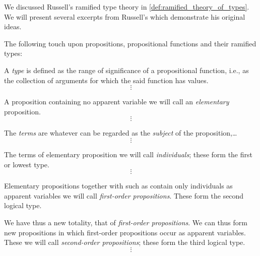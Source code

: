 \begin{remark}\label{rem:hol_formula_order_origin}
  We discussed Russell's ramified type theory in \cref{def:ramified_theory_of_types}. We will present several excerpts from Russell's \cite{Russell1908TypeTheory} which demonstrate his original ideas.

  \begin{thmenum}
     The following touch upon propositions, propositional functions and their ramified types:
    \begin{displayquote}
      A \textit{type} is defined as the range of significance of a propositional function, i.e., as the collection of arguments for which the said function has values.
      \begin{equation*}
        \vdots
      \end{equation*}

      A proposition containing no apparent variable we will call an \textit{elementary} proposition.
      \begin{equation*}
        \vdots
      \end{equation*}

      The \textit{terms} are whatever can be regarded as the \textit{subject} of the proposition,\ldots
      \begin{equation*}
        \vdots
      \end{equation*}

      The terms of elementary proposition we will call \textit{individuals}; these form the first or lowest type.
      \begin{equation*}
        \vdots
      \end{equation*}

      Elementary propositions together with such as contain only individuals as apparent variables we will call \textit{first-order propositions}. These form the second logical type.

      We have thus a new totality, that of \textit{first-order propositions}. We can thus form new propositions in which first-order propositions occur as apparent variables. These we will call \textit{second-order propositions}; these form the third logical type.
      \begin{equation*}
        \vdots
      \end{equation*}


\end{displayquote}
\end{thmenum}
\end{remark}
